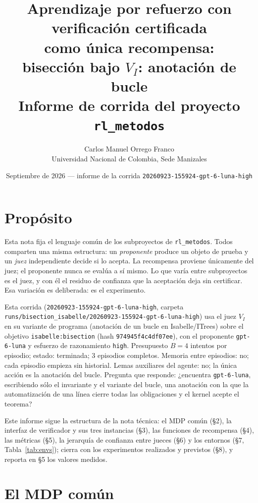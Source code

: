\documentclass[11pt,a4paper]{article}
\title{Aprendizaje por refuerzo con verificación certificada\\como única recompensa:\\bisección bajo $V_I$: anotación de bucle\\[0.4em]\large Informe de corrida del proyecto \texttt{rl\_metodos}}
\author{Carlos Manuel Orrego Franco\\Universidad Nacional de Colombia, Sede Manizales}
\date{Septiembre de 2026 --- informe de la corrida \texttt{20260923-\allowbreak{}155924-\allowbreak{}gpt-\allowbreak{}6-\allowbreak{}luna-\allowbreak{}high}}
\begin{document}
\maketitle

\section{Propósito}

Esta nota fija el lenguaje común de los subproyectos de \texttt{rl\_metodos}. Todos comparten una misma estructura: un \emph{proponente} produce un objeto de prueba y un \emph{juez} independiente decide si lo acepta. La recompensa proviene únicamente del juez; el proponente nunca se evalúa a sí mismo. Lo que varía entre subproyectos es el juez, y con él el residuo de confianza que la aceptación deja sin certificar. Esa variación es deliberada: es el experimento.

Esta corrida (\texttt{20260923-\allowbreak{}155924-\allowbreak{}gpt-\allowbreak{}6-\allowbreak{}luna-\allowbreak{}high}, carpeta \texttt{runs/\allowbreak{}bisection\_\allowbreak{}isabelle/\allowbreak{}20260923-\allowbreak{}155924-\allowbreak{}gpt-\allowbreak{}6-\allowbreak{}luna-\allowbreak{}high}) usa el juez $V_I$ en su variante de programa (anotación de un bucle en Isabelle/ITrees) sobre el objetivo \texttt{isabelle:\allowbreak{}bisection} (hash \texttt{974945f4c4df07ee}), con el proponente \texttt{gpt-\allowbreak{}6-\allowbreak{}luna} y esfuerzo de razonamiento \texttt{high}. Presupuesto $B = 4$ intentos por episodio; estado: terminada; 3 episodios completos. Memoria entre episodios: no; cada episodio empieza sin historial. Lemas auxiliares del agente: no; la única acción es la anotación del bucle. Pregunta que responde: ¿encuentra \texttt{gpt-\allowbreak{}6-\allowbreak{}luna}, escribiendo sólo el invariante y el variante del bucle, una anotación con la que la automatización de una línea cierre todas las obligaciones y el kernel acepte el teorema?

Este informe sigue la estructura de la nota técnica: el MDP común (§2), la interfaz de verificador y sus tres instancias (§3), las funciones de recompensa (§4), las métricas (§5), la jerarquía de confianza entre jueces (§6) y los entornos (§7, Tabla~\ref{tab:envs}); cierra con los experimentos realizados y previstos (§8), y reporta en §5 los valores medidos.

\section{El MDP común}
\end{document}
